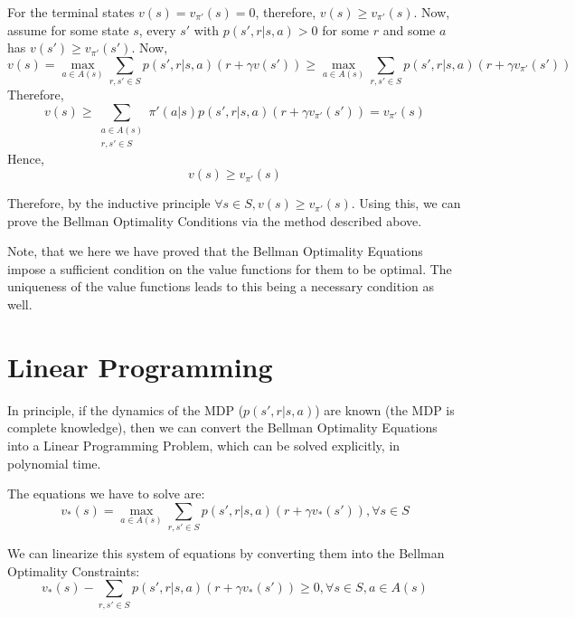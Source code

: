 \documentclass[12pt]{report}
\begin{document}
For the terminal states $v(s) = v_{\pi'}(s) = 0$, therefore, $v(s) \geq v_{\pi'}(s)$. Now, assume for some state $s$, every $s'$ with $p(s', r | s, a) > 0$ for some $r$ and some $a$ has $v(s') \geq v_{\pi'}(s')$.
Now,
\begin{equation}
    v(s) = \max_{a \in A(s)} \sum\limits_{r, s' \in S} p(s', r | s, a) (r + \gamma v(s')) \geq \max_{a \in A(s)} \sum\limits_{r, s' \in S} p(s', r | s, a) (r + \gamma v_{\pi'}(s'))
\end{equation}
Therefore,
\begin{equation}
    v(s) \geq \sum\limits_{\substack{a \in A(s)\\r, s' \in S}} \pi'(a | s) p(s', r | s, a) (r + \gamma v_{\pi'}(s')) = v_{\pi'}(s)
\end{equation}
Hence,
\begin{equation}
    v(s) \geq v_{\pi'}(s)
\end{equation}

Therefore, by the inductive principle $\forall s \in S, v(s) \geq v_{\pi'}(s)$. Using this, we can prove the Bellman Optimality Conditions via the method described above.

Note, that we here we have proved that the Bellman Optimality Equations impose a sufficient condition on the value functions for them to be optimal. The uniqueness of the value functions leads to this being a necessary condition as well.

\section{Linear Programming}
In principle, if the dynamics of the MDP ($p(s', r | s, a)$) are known (the MDP is complete knowledge), then we can convert the Bellman Optimality Equations into a Linear Programming Problem, which can be solved explicitly, in polynomial time.

The equations we have to solve are:
\begin{equation}
    v_{*}(s) = \max\limits_{a \in A(s)} \sum\limits_{r, s' \in S} p(s', r | s, a) (r + \gamma v_{*}(s')), \forall s \in S
\end{equation}

We can linearize this system of equations by converting them into the Bellman Optimality Constraints:
\begin{equation}
    v_{*}(s) - \sum\limits_{r, s' \in S} p(s', r | s, a) (r + \gamma v_{*}(s')) \geq 0, \forall s \in S, a \in A(s)
\end{equation}
\end{document}
